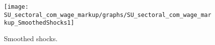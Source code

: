  
\begin{figure}[H]
\centering 
\texttt{[image: SU\_sectoral\_com\_wage\_markup/graphs/SU\_sectoral\_com\_wage\_markup\_SmoothedShocks1]}
\caption{Smoothed shocks.}\label{Fig:SmoothedShocks:1}
\end{figure}


